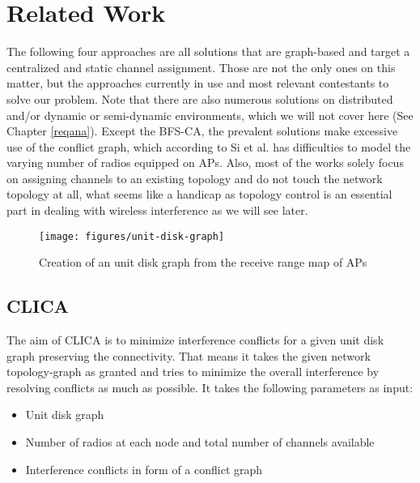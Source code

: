 \chapter{Related Work}
  The following four approaches are all solutions that are graph-based and target a centralized and static channel assignment.
  Those are not the only ones on this matter, but the approaches currently in use and most relevant contestants to solve our problem.
  Note that there are also numerous solutions on distributed and/or dynamic or semi-dynamic environments, which we will not cover here (See Chapter \ref{reqana}).
  Except the \ac{BFS-CA}, the prevalent solutions make excessive use of the conflict graph, which according to Si et al. \cite{overview_caa} has difficulties to model 
  the varying number of radios equipped on APs. Also, most of the works solely focus on assigning channels to an existing topology and do not touch 
  the network topology at all, what seems like a handicap as topology control is an essential part in dealing with wireless interference as we will see later.
  
  \begin{figure}[h!]
    \centering
    \texttt{[image: figures/unit-disk-graph]}
    \caption{Creation of an unit disk graph from the receive range map of APs}
    \label{fig:unit-disk-graph}
  \end{figure}
  
  \section{\ac{CLICA}}
    The aim of \ac{CLICA} \cite{CLICA} is to minimize interference conflicts for a given unit disk graph preserving the connectivity.
    That means it takes the given network topology-graph as granted and tries to minimize the overall interference by resolving conflicts as much as possible.
    It takes the following parameters as input:
    
    \begin{itemize}
      \item Unit disk graph
      
      \item Number of radios at each node and total number of channels available
      
      \item Interference conflicts in form of a conflict graph
    \end{itemize}
    
